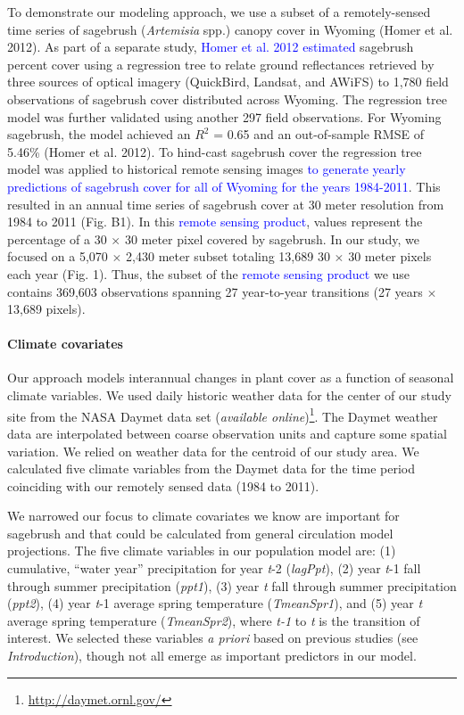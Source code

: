 \documentclass[12pt,]{article}
\let\rmarkdownfootnote\footnote%
\def\footnote{\protect\rmarkdownfootnote}
\begin{document}
To demonstrate our modeling approach, we use a subset of a
remotely-sensed time series of sagebrush (\emph{Artemisia} spp.) canopy
cover in Wyoming (Homer et al. 2012). As part of a separate study,
\textcolor{blue}{Homer et al. 2012 estimated} sagebrush percent cover
using a regression tree to relate ground reflectances retrieved by three
sources of optical imagery (QuickBird, Landsat, and AWiFS) to 1,780
field observations of sagebrush cover distributed across Wyoming. The
regression tree model was further validated using another 297 field
observations. For Wyoming sagebrush, the model achieved an \(R^{2}\) =
0.65 and an out-of-sample RMSE of 5.46\% (Homer et al. 2012). To
hind-cast sagebrush cover the regression tree model was applied to
historical remote sensing images
\textcolor{blue}{to generate yearly predictions of sagebrush cover for all of Wyoming for the years 1984-2011}.
This resulted in an annual time series of sagebrush cover at 30 meter
resolution from 1984 to 2011 (Fig. B1). In this
\textcolor{blue}{remote sensing product}, values represent the
percentage of a 30 \(\times\) 30 meter pixel covered by sagebrush. In
our study, we focused on a 5,070 \(\times\) 2,430 meter subset totaling
13,689 30 \(\times\) 30 meter pixels each year (Fig. 1). Thus, the
subset of the \textcolor{blue}{remote sensing product} we use contains
369,603 observations spanning 27 year-to-year transitions (27 years
\(\times\) 13,689 pixels).

\paragraph{Climate covariates}\label{climate-covariates}

Our approach models interannual changes in plant cover as a function of
seasonal climate variables. We used daily historic weather data for the
center of our study site from the NASA Daymet data set (\emph{available
online})\footnote{\url{http://daymet.ornl.gov/}}. The Daymet weather
data are interpolated between coarse observation units and capture some
spatial variation. We relied on weather data for the centroid of our
study area. We calculated five climate variables from the Daymet data
for the time period coinciding with our remotely sensed data (1984 to
2011).

We narrowed our focus to climate covariates we know are important for
sagebrush and that could be calculated from general circulation model
projections. The five climate variables in our population model are: (1)
cumulative, ``water year'' precipitation for year \emph{t}-2
(\emph{lagPpt}), (2) year \emph{t}-1 fall through summer precipitation
(\emph{ppt1}), (3) year \emph{t} fall through summer precipitation
(\emph{ppt2}), (4) year \emph{t}-1 average spring temperature
(\emph{TmeanSpr1}), and (5) year \emph{t} average spring temperature
(\emph{TmeanSpr2}), where \emph{t-1} to \emph{t} is the transition of
interest. We selected these variables \emph{a priori} based on previous
studies (see \emph{Introduction}), though not all emerge as important
predictors in our model.
\end{document}
